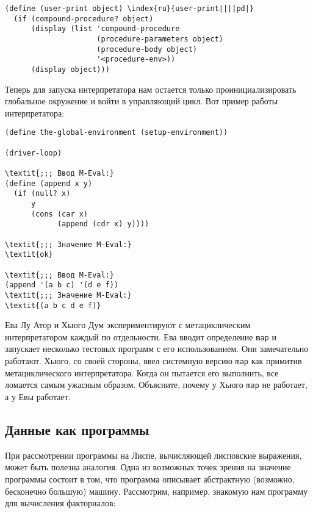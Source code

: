 \begin{Verbatim}[fontsize=\small]
(define (user-print object) \index{ru}{user-print||||pd|}
  (if (compound-procedure? object)
      (display (list 'compound-procedure
                     (procedure-parameters object)
                     (procedure-body object)
                     '<procedure-env>))
      (display object)))
\end{Verbatim}

Теперь для запуска интерпретатора нам остается только
проинициализировать глобальное окружение и войти в управляющий цикл.
Вот пример работы интерпретатора:

\begin{Verbatim}[fontsize=\small]
(define the-global-environment (setup-environment))

(driver-loop)

\textit{;;; Ввод M-Eval:}
(define (append x y)
  (if (null? x)
      y
      (cons (car x)
            (append (cdr x) y))))

\textit{;;; Значение M-Eval:}
\textit{ok}

\textit{;;; Ввод M-Eval:}
(append '(a b c) '(d e f))
\textit{;;; Значение M-Eval:}
\textit{(a b c d e f)}
\end{Verbatim}

\begin{exercise}{4.14}%
\label{EX4.14}%
Ева Лу Атор и Хьюго Дум экспериментируют с
метациклическим интерпретатором каждый по отдельности.  Ева вводит
определение {\tt map} и запускает несколько тестовых программ с
его использованием.  Они замечательно работают.  Хьюго, со своей
стороны, ввел системную версию {\tt map} как примитив
метациклического интерпретатора.  Когда он пытается его выполнить, все
ломается самым ужасным образом.  Объясните, почему у Хьюго
{\tt map} не работает, а у Евы работает.
\end{exercise}

\subsection{Данные как программы}
\label{DATA-AS-PROGRAMS}%

При рассмотрении программы на Лиспе, вычисляющей
лисповские выражения, может быть полезна аналогия.  Одна из возможных
точек зрения на значение программы состоит в том, что программа описывает
абстрактную (возможно, 
бесконечно большую) машину.  Рассмотрим,
например, знакомую нам программу для вычисления 
факториалов:


